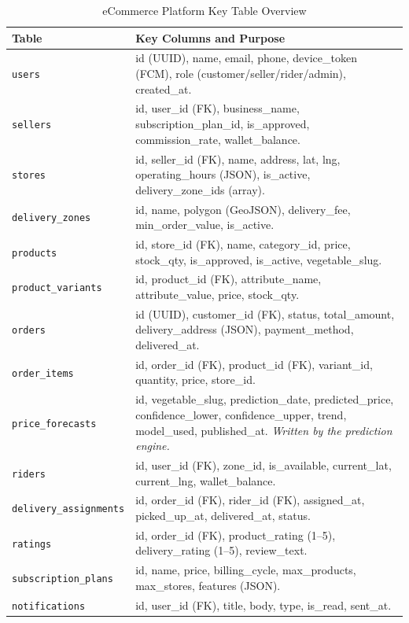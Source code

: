 \documentclass[12pt, a4paper, oneside]{report}
\begin{document}
\begin{table}[H]
\centering
\caption{eCommerce Platform Key Table Overview}
\label{tab:ec-schema}
\begin{tabularx}{\textwidth}{@{} L{3.4cm} X @{}}
\toprule
\textbf{Table} & \textbf{Key Columns and Purpose} \\
\midrule
\texttt{users}
  & id (UUID), name, email, phone, device\_token (FCM), role
    (customer/seller/rider/admin), created\_at. \\[4pt]
\texttt{sellers}
  & id, user\_id (FK), business\_name, subscription\_plan\_id,
    is\_approved, commission\_rate, wallet\_balance. \\[4pt]
\texttt{stores}
  & id, seller\_id (FK), name, address, lat, lng, operating\_hours (JSON),
    is\_active, delivery\_zone\_ids (array). \\[4pt]
\texttt{delivery\_zones}
  & id, name, polygon (GeoJSON), delivery\_fee, min\_order\_value,
    is\_active. \\[4pt]
\texttt{products}
  & id, store\_id (FK), name, category\_id, price, stock\_qty,
    is\_approved, is\_active, vegetable\_slug. \\[4pt]
\texttt{product\_variants}
  & id, product\_id (FK), attribute\_name, attribute\_value, price,
    stock\_qty. \\[4pt]
\texttt{orders}
  & id (UUID), customer\_id (FK), status, total\_amount,
    delivery\_address (JSON), payment\_method, delivered\_at. \\[4pt]
\texttt{order\_items}
  & id, order\_id (FK), product\_id (FK), variant\_id, quantity, price,
    store\_id. \\[4pt]
\texttt{price\_forecasts}
  & id, vegetable\_slug, prediction\_date, predicted\_price,
    confidence\_lower, confidence\_upper, trend, model\_used,
    published\_at. \textit{Written by the prediction engine.} \\[4pt]
\texttt{riders}
  & id, user\_id (FK), zone\_id, is\_available, current\_lat,
    current\_lng, wallet\_balance. \\[4pt]
\texttt{delivery\_assignments}
  & id, order\_id (FK), rider\_id (FK), assigned\_at, picked\_up\_at,
    delivered\_at, status. \\[4pt]
\texttt{ratings}
  & id, order\_id (FK), product\_rating (1--5), delivery\_rating (1--5),
    review\_text. \\[4pt]
\texttt{subscription\_plans}
  & id, name, price, billing\_cycle, max\_products, max\_stores,
    features (JSON). \\[4pt]
\texttt{notifications}
  & id, user\_id (FK), title, body, type, is\_read, sent\_at. \\
\bottomrule
\end{tabularx}
\end{table}
\end{document}
